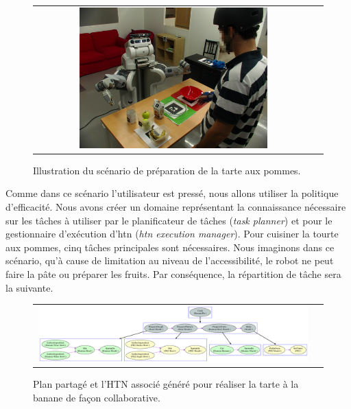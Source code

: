 \documentclass[a4paper,11pt,twoside]{StyleThese}
\begin{document}
\begin{figure}[ht!]

 \centering
 \begin{tabular}{cc}
  \includegraphics[width=0.69\textwidth]{img/scenario.JPG}
 \end{tabular}
 \caption{Illustration du scénario de préparation de la tarte aux pommes.}
 \label{fig:scenario}
 \end{figure}

Comme dans ce scénario l'utilisateur est pressé, nous allons utiliser la politique d'efficacité.
Nous avons créer un domaine représentant la connaissance nécessaire sur les tâches à utiliser par le planificateur de tâches (\textit{task planner}) et pour le gestionnaire d'exécution d'htn (\textit{htn execution manager}).
Pour cuisiner la tourte aux pommes, cinq tâches principales sont nécessaires. Nous imaginons dans ce scénario, qu'à cause de limitation au niveau de l'accessibilité, le robot ne peut faire la pâte ou préparer les fruits. Par conséquence, la répartition de tâche sera la suivante.

\begin{figure}[ht!]

 \centering
 \begin{tabular}{cc}
  \includegraphics[width=0.99\textwidth]{img/bananaPie.pdf}
 \end{tabular}
 \caption{Plan partagé et l'HTN associé généré pour réaliser la tarte à la banane de façon collaborative.}
 \label{fig:bananaPlan}
 \end{figure}
 
\end{document}
